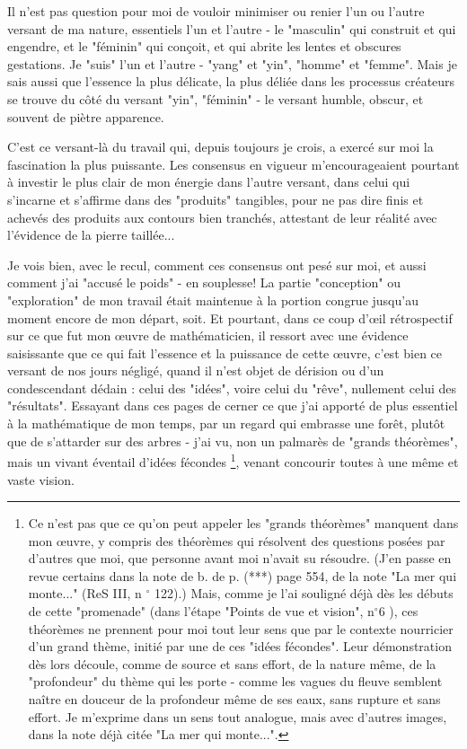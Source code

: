 Il n'est pas question pour moi de vouloir minimiser ou renier l'un ou l'autre versant de ma nature, essentiels l'un et l'autre - le "masculin" qui construit et qui engendre, et le "féminin" qui conçoit, et qui abrite les lentes et obscures gestations. Je "suis" l'un et l'autre - "yang" et "yin", "homme" et "femme". Mais je sais aussi que l'essence la plus délicate, la plus déliée dans les processus créateurs se trouve du côté du versant "yin", "féminin" - le versant humble, obscur, et souvent de piètre apparence.

C'est ce versant-là du travail qui, depuis toujours je crois, a exercé sur moi la fascination la plus puissante. Les consensus en vigueur m'encourageaient pourtant à investir le plus clair de mon énergie dans l'autre versant, dans celui qui s'incarne et s'affirme dans des "produits" tangibles, pour ne pas dire finis et achevés des produits aux contours bien tranchés, attestant de leur réalité avec l'évidence de la pierre taillée...

Je vois bien, avec le recul, comment ces consensus ont pesé sur moi, et aussi comment j'ai "accusé le poids" - en souplesse! La partie "conception" ou "exploration" de mon travail était maintenue à la portion congrue jusqu'au moment encore de mon départ, soit. Et pourtant, dans ce coup d'œil rétrospectif sur ce que fut mon œuvre de mathématicien, il ressort avec une évidence saisissante que ce qui fait l'essence et la puissance de cette œuvre, c'est bien ce versant de nos jours négligé, quand il n'est objet de dérision ou d'un condescendant dédain : celui des "idées", voire celui du "rêve", nullement celui des "résultats". Essayant dans ces pages de cerner ce que j'ai apporté de plus essentiel à la mathématique de mon temps, par un regard qui embrasse une forêt, plutôt que de s'attarder sur des arbres - j'ai vu, non un palmarès de "grands théorèmes", mais un vivant éventail d'idées fécondes \footnote{Ce n'est pas que ce qu'on peut appeler les "grands théorèmes" manquent dans mon œuvre, y compris des théorèmes qui résolvent des questions posées par d'autres que moi, que personne avant moi n'avait su résoudre. (J'en passe en revue certains dans la note de b. de p. (***) page 554, de la note "La mer qui monte..." (ReS III, n ${ }^{\circ}$ 122).) Mais, comme je l'ai souligné déjà dès les débuts de cette "promenade" (dans l'étape "Points de vue et vision", $\mathrm{n}^{\circ} 6$ ), ces théorèmes ne prennent pour moi tout leur sens que par le contexte nourricier d'un grand thème, initié par une de ces "idées fécondes". Leur démonstration dès lors découle, comme de source et sans effort, de la nature même, de la "profondeur" du thème qui les porte - comme les vagues du fleuve semblent naître en douceur de la profondeur même de ses eaux, sans rupture et sans effort. Je m'exprime dans un sens tout analogue, mais avec d'autres images, dans la note déjà citée "La mer qui monte...".}, venant concourir toutes à une même et vaste vision.









